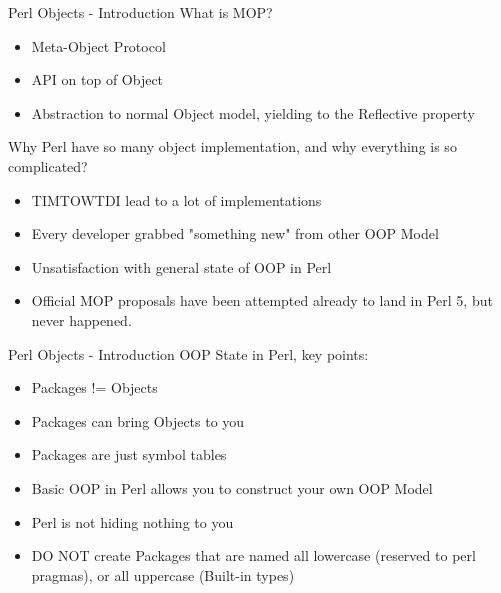 \documentclass[10pt]{beamer}
\begin{document}
\begin{frame}[fragile]{Perl Objects - Introduction}
What is MOP?
\begin{itemize}
\item Meta-Object Protocol
\item API on top of Object
\item Abstraction to normal Object model, yielding to the Reflective property
\end{itemize}
Why Perl have so many object implementation, and why everything is so complicated?
\begin{itemize}
\item TIMTOWTDI lead to a lot of implementations
\item Every developer grabbed "something new" from other OOP Model
\item Unsatisfaction with general state of OOP in Perl
\item Official MOP proposals have been attempted already to land in Perl 5, but never happened.
\end{itemize}
\end{frame}

\begin{frame}[fragile]{Perl Objects - Introduction}
OOP State in Perl, key points:
\begin{itemize}
\item Packages != Objects
\item Packages can bring Objects to you
\item Packages are just symbol tables
\item Basic OOP in Perl allows you to construct your own OOP Model
\item Perl is not hiding nothing to you
\item DO NOT create Packages that are named all lowercase (reserved to perl pragmas), or all uppercase (Built-in types)
\end{itemize}
\end{frame}

\end{document}
